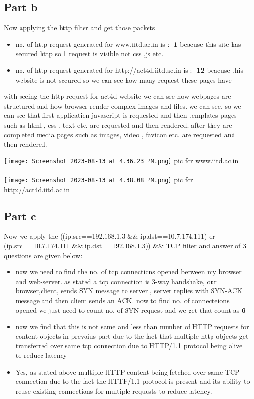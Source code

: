\documentclass[11pt]{scrartcl}
\begin{document}
\subsection{Part b}
Now applying the http filter and get those packets 
\begin{itemize}
    \item no. of http request generated for www.iitd.ac.in is :- \textbf{1} beacuse this site has secured http so 1 request is visible not css ,js etc.
    \item no. of http request generated for http://act4d.iitd.ac.in is :- \textbf{12} beacuse this website is not secured  so we can see how many request these pages have
\end{itemize}
with seeing the http request for act4d website we can see how webpages are structured and how browser render complex images and files. we can see. so we can see that first application javascript is requested and then templates pages such as html , css , text etc. are requested and then rendered. after they are completed media pages such as images, video , favicon etc. are requested and then rendered.

\texttt{[image: Screenshot 2023-08-13 at 4.36.23 PM.png]}
pic for www.iitd.ac.in\\ \\
\texttt{[image: Screenshot 2023-08-13 at 4.38.08 PM.png]}
pic for http://act4d.iitd.ac.in

\subsection{Part c}
Now we apply the ((ip.src==192.168.1.3 \&\& ip.dst==10.7.174.111) or (ip.src==10.7.174.111 \&\& ip.dst==192.168.1.3)) \&\& TCP filter and answer of 3 questions are given below:
\begin{itemize}
    \item now we need to find the no. of tcp connections opened between my browser and web-server. as stated a tcp connection is 3-way handshake, our browser,client, sends SYN message to server , server replies with SYN-ACK message and then client sends an ACK. now to find no. of connecteions opened we just need to count no. of SYN request and we get that count as \textbf{6}
    \item now we find that this is not same and less than number of HTTP requests for content objects in prevoius part due to the fact that multiple http objects get transferred over same tcp connection due to HTTP/1.1 protocol being alive to reduce latency
    \item Yes, as stated above multiple HTTP content being fetched over same TCP connection due to the fact the HTTP/1.1 protocol is present and its ability to reuse existing connections for multiple requests to reduce latency.
\end{itemize}
\end{document}
